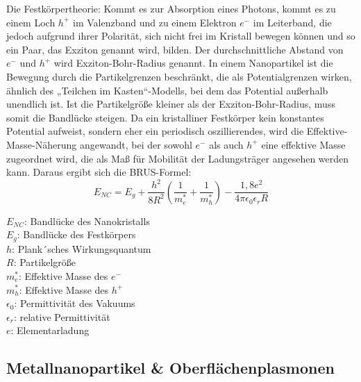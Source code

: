 	Die Festkörpertheorie: Kommt es zur Absorption eines Photons, kommt es zu einem Loch $h^{+}$  im Valenzband und zu einem Elektron $e^{-}$ im Leiterband, die jedoch aufgrund ihrer Polarität, sich nicht frei im Kristall bewegen können und so ein Paar, das Exziton genannt wird, bilden. Der durchschnittliche Abstand von $e^{-}$ und $h^{+}$ wird Exziton-Bohr-Radius genannt. In einem Nanopartikel ist die Bewegung durch die Partikelgrenzen beschränkt, die als Potentialgrenzen wirken, ähnlich des „Teilchen im Kasten“-Modells, bei dem das Potential außerhalb unendlich ist.
	Ist die Partikelgröße kleiner als der Exziton-Bohr-Radius, muss somit die Bandlücke steigen.
	Da ein kristalliner Festkörper kein konstantes Potential aufweist, sondern eher ein periodisch oszillierendes, wird die Effektive-Masse-Näherung angewandt, bei der sowohl $e^{-}$ als auch $h^{+}$ eine effektive Masse zugeordnet wird, die als Maß für Mobilität der Ladungsträger angesehen werden kann. Daraus ergibt sich die BRUS-Formel:
	\begin{equation}
	\label{eq:BRUS}
	E_{NC}=E_{g}+\frac{h^{2}}{8R^{2}}\left( \frac{1}{m^{*}_{e}}+\frac{1}{m^{*}_{h}}\right)-\frac{1,8e^{2}}{4\pi\epsilon_{0}\epsilon_{r}R} 
	\end{equation}
	\begin{multicols}{2}
		\begin{flushleft}
			$E_{NC}$:	Bandlücke des Nanokristalls\\
			$E_{g}$:	Bandlücke des Festkörpers\\
			$h$:		Plank´sches Wirkungsquantum\\
			$R$:		Partikelgröße\\
			$m^{*}_{e}$: Effektive Masse des $e^{-}$\\
			$m^{*}_{h}$: Effektive Masse des $h^{+}$\\
			$\epsilon_{0}$: Permittivität des Vakuums\\
			$\epsilon_{r}$: relative Permittivität\\
			$e$: Elementarladung\\
		\end{flushleft}
	\end{multicols}
	

    \subsection{Metallnanopartikel \& Oberflächenplasmonen}
    
